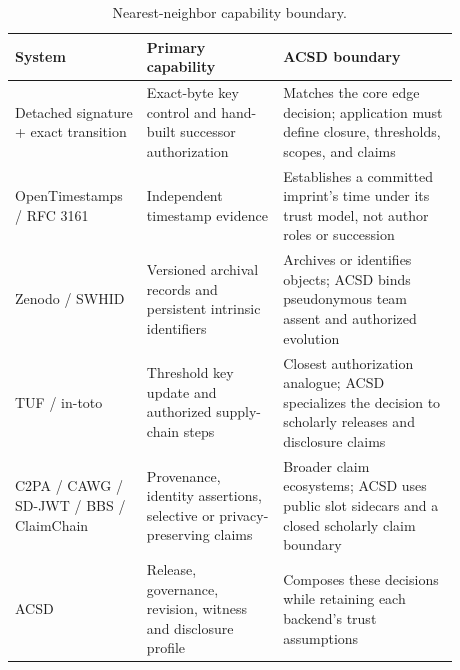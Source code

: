 \documentclass[conference,compsoc]{IEEEtran}
\begin{document}
\begin{table}[h]
\centering
\caption{Nearest-neighbor capability boundary.}
\label{tab:capability-boundary}
\begin{tabular}{p{0.23\linewidth}p{0.29\linewidth}p{0.36\linewidth}}
\toprule
System & Primary capability & ACSD boundary \\
\midrule
Detached signature + exact transition & Exact-byte key control and hand-built successor authorization & Matches the core edge decision; application must define closure, thresholds, scopes, and claims \\
OpenTimestamps / RFC 3161 & Independent timestamp evidence & Establishes a committed imprint's time under its trust model, not author roles or succession \\
Zenodo / SWHID & Versioned archival records and persistent intrinsic identifiers & Archives or identifies objects; ACSD binds pseudonymous team assent and authorized evolution \\
TUF / in-toto & Threshold key update and authorized supply-chain steps & Closest authorization analogue; ACSD specializes the decision to scholarly releases and disclosure claims \\
C2PA / CAWG / SD-JWT / BBS / ClaimChain & Provenance, identity assertions, selective or privacy-preserving claims & Broader claim ecosystems; ACSD uses public slot sidecars and a closed scholarly claim boundary \\
ACSD & Release, governance, revision, witness and disclosure profile & Composes these decisions while retaining each backend's trust assumptions \\
\bottomrule
\end{tabular}
\end{table}
\end{document}
